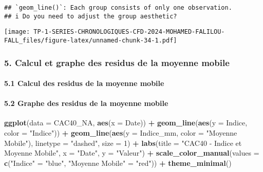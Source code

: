 \documentclass[
]{article}
\newenvironment{Shaded}{\begin{snugshade}}{\end{snugshade}}
\newcommand{\AttributeTok}[1]{\textcolor[rgb]{0.13,0.29,0.53}{#1}}
\newcommand{\DecValTok}[1]{\textcolor[rgb]{0.00,0.00,0.81}{#1}}
\newcommand{\FunctionTok}[1]{\textcolor[rgb]{0.13,0.29,0.53}{\textbf{#1}}}
\newcommand{\NormalTok}[1]{#1}
\newcommand{\OtherTok}[1]{\textcolor[rgb]{0.56,0.35,0.01}{#1}}
\newcommand{\SpecialCharTok}[1]{\textcolor[rgb]{0.81,0.36,0.00}{\textbf{#1}}}
\newcommand{\StringTok}[1]{\textcolor[rgb]{0.31,0.60,0.02}{#1}}
\begin{document}
\begin{verbatim}
## `geom_line()`: Each group consists of only one observation.
## i Do you need to adjust the group aesthetic?
\end{verbatim}

\texttt{[image: TP-1-SERIES-CHRONOLOGIQUES-CFD-2024-MOHAMED-FALILOU-FALL\_files/figure-latex/unnamed-chunk-34-1.pdf]}

\subsubsection{5. Calcul et graphe des residus de la moyenne
mobile}\label{calcul-et-graphe-des-residus-de-la-moyenne-mobile}

\paragraph{5.1 Calcul des residus de la moyenne
mobile}\label{calcul-des-residus-de-la-moyenne-mobile}

\begin{Shaded}
\end{Shaded}

\paragraph{5.2 Graphe des residus de la moyenne
mobile}\label{graphe-des-residus-de-la-moyenne-mobile}

\begin{Shaded}
\begin{Highlighting}[]
\FunctionTok{ggplot}\NormalTok{(}\AttributeTok{data =}\NormalTok{ CAC40\_NA, }\FunctionTok{aes}\NormalTok{(}\AttributeTok{x =}\NormalTok{ Date)) }\SpecialCharTok{+}
  \FunctionTok{geom\_line}\NormalTok{(}\FunctionTok{aes}\NormalTok{(}\AttributeTok{y =}\NormalTok{ Indice, }\AttributeTok{color =} \StringTok{"Indice"}\NormalTok{)) }\SpecialCharTok{+}
  \FunctionTok{geom\_line}\NormalTok{(}\FunctionTok{aes}\NormalTok{(}\AttributeTok{y =}\NormalTok{ Indice\_mm, }\AttributeTok{color =} \StringTok{"Moyenne Mobile"}\NormalTok{), }\AttributeTok{linetype =} \StringTok{"dashed"}\NormalTok{, }\AttributeTok{size =} \DecValTok{1}\NormalTok{) }\SpecialCharTok{+}
  \FunctionTok{labs}\NormalTok{(}\AttributeTok{title =} \StringTok{"CAC40 {-} Indice et Moyenne Mobile"}\NormalTok{,}
       \AttributeTok{x =} \StringTok{"Date"}\NormalTok{,}
       \AttributeTok{y =} \StringTok{"Valeur"}\NormalTok{) }\SpecialCharTok{+}
  \FunctionTok{scale\_color\_manual}\NormalTok{(}\AttributeTok{values =} \FunctionTok{c}\NormalTok{(}\StringTok{"Indice"} \OtherTok{=} \StringTok{"blue"}\NormalTok{, }\StringTok{"Moyenne Mobile"} \OtherTok{=} \StringTok{"red"}\NormalTok{)) }\SpecialCharTok{+}
  \FunctionTok{theme\_minimal}\NormalTok{()}
\end{Highlighting}
\end{Shaded}
\end{document}
